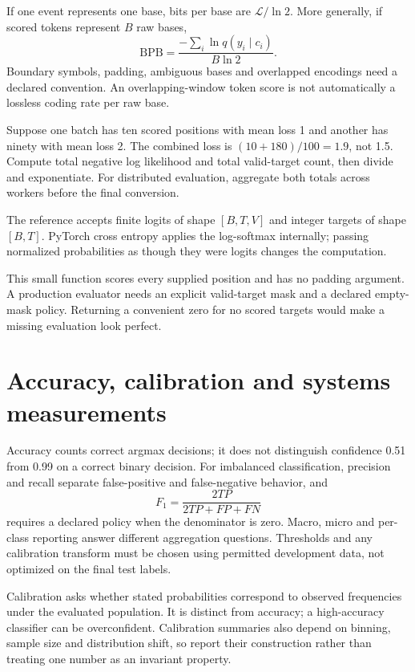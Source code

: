 If one event represents one base, bits per base are $\mathcal L/\ln2$. More generally, if scored tokens represent $B$ raw bases,
\[
\mathrm{BPB}=\frac{-\sum_i\ln q(y_i\mid c_i)}{B\ln2}.
\]
Boundary symbols, padding, ambiguous bases and overlapped encodings need a declared convention. An overlapping-window token score is not automatically a lossless coding rate per raw base.

Suppose one batch has ten scored positions with mean loss 1 and another has ninety with mean loss 2. The combined loss is $(10+180)/100=1.9$, not 1.5. Compute total negative log likelihood and total valid-target count, then divide and exponentiate. For distributed evaluation, aggregate both totals across workers before the final conversion.

The reference accepts finite logits of shape $[B,T,V]$ and integer targets of shape $[B,T]$. PyTorch cross entropy applies the log-softmax internally; passing normalized probabilities as though they were logits changes the computation.\cite{e2torchce}
\begin{minipage}{\linewidth}
\end{minipage}

This small function scores every supplied position and has no padding argument. A production evaluator needs an explicit valid-target mask and a declared empty-mask policy. Returning a convenient zero for no scored targets would make a missing evaluation look perfect.

\section{Accuracy, calibration and systems measurements}
Accuracy counts correct argmax decisions; it does not distinguish confidence 0.51 from 0.99 on a correct binary decision. For imbalanced classification, precision and recall separate false-positive and false-negative behavior, and
\[
F_1=\frac{2TP}{2TP+FP+FN}
\]
requires a declared policy when the denominator is zero. Macro, micro and per-class reporting answer different aggregation questions. Thresholds and any calibration transform must be chosen using permitted development data, not optimized on the final test labels.

Calibration asks whether stated probabilities correspond to observed frequencies under the evaluated population. It is distinct from accuracy;\cite{e2calibration} a high-accuracy classifier can be overconfident. Calibration summaries also depend on binning, sample size and distribution shift, so report their construction rather than treating one number as an invariant property.

